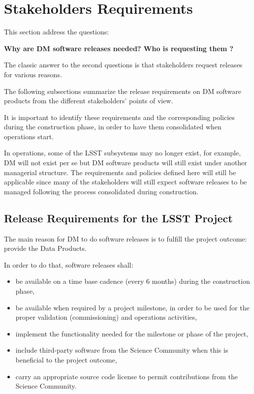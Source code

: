 \section{Stakeholders Requirements} \label{sec:reqs}

This section address the questions:

\textbf{Why are DM software releases needed? Who is requesting them ?}

The classic answer to the second questions is that  stakeholders request releases for various reasons.

The following subsections summarize the release requirements on \gls{DM} software products from the different stakeholders' points of view.

It is important to identify these requirements and the corresponding policies during the construction phase, in order to have them consolidated when operations start.

In operations, some of the \gls{LSST} subsystems may no longer exist, for example, \gls{DM} will not exist per se but \gls{DM} software products will still exist under another managerial structure.
The requirements and policies defined here will still be applicable since many of the stakeholders will still expect software releases to be managed following the process consolidated during construction.


\subsection{Release Requirements for the \gls{LSST} Project} \label{sec:lsstreqs}

The main reason for DM to do software releases is to fulfill the project outcome: provide the Data Products.

In order to do that, software releases shall:

\begin{itemize}
\item be available on a time base cadence (every 6 months) during the construction phase,
\item be available when required by a project milestone, in order to be used for the proper validation (commissioning) and operations activities,
\item implement the  functionality needed for the milestone or phase of the project,
\item include third-party software from the Science Community when this is beneficial to the project outcome,
\item carry an appropriate source code license to permit contributions from the Science Community.
\end{itemize}


